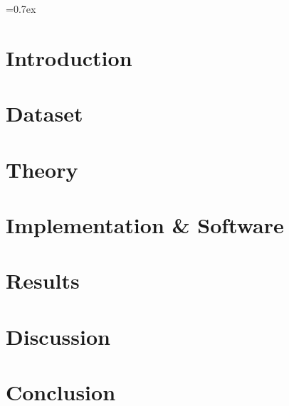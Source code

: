 


	
	\font=0.7ex%

	
	\thispagestyle{empty}
	\clearpage
	\tableofcontents
	\thispagestyle{empty}
	
	\pagestyle{fancy}
	\fancyhf{}
	\cfoot{\thepage}
	
	\newpage
	\section{Introduction}
	
	
	\newpage
	\section{Dataset}\label{sec:dataset}
	
	
	\clearpage
	\section{Theory}\label{sec:theory}
	
	
	\newpage
	\section{Implementation \& Software}				\label{sec:implementation_software}
	
	
	\newpage
	\section{Results}\label{sec:results}
	
	
	\newpage
	\section{Discussion}\label{sec:discussion}
	
	
	\newpage
	\section{Conclusion}\label{sec:conclusion_outlook}
	

	\newpage
	\printbibliography
	
